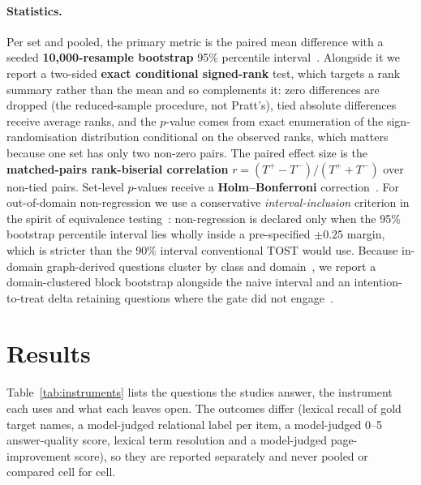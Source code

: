 \documentclass[10pt,twocolumn]{article}
\begin{document}
\paragraph{Statistics.} Per set and pooled, the primary metric is the paired mean difference with a seeded \textbf{10{,}000-resample bootstrap} 95\% percentile interval~\cite{efron1979bootstrap,koehn2004significance}. Alongside it we report a two-sided \textbf{exact conditional signed-rank} test, which targets a rank summary rather than the mean and so complements it: zero differences are dropped (the reduced-sample procedure, not Pratt's), tied absolute differences receive average ranks, and the $p$-value comes from exact enumeration of the sign-randomisation distribution conditional on the observed ranks, which matters because one set has only two non-zero pairs. The paired effect size is the \textbf{matched-pairs rank-biserial correlation} $r=(T^{+}-T^{-})/(T^{+}+T^{-})$ over non-tied pairs. Set-level $p$-values receive a \textbf{Holm--Bonferroni} correction~\cite{dror2018hitchhiker}. For out-of-domain non-regression we use a conservative \emph{interval-inclusion} criterion in the spirit of equivalence testing~\cite{lakens2017equivalence}: non-regression is declared only when the 95\% bootstrap percentile interval lies wholly inside a pre-specified $\pm0.25$ margin, which is stricter than the 90\% interval conventional TOST would use. Because in-domain graph-derived questions cluster by class and domain~\cite{dror2018hitchhiker}, we report a domain-clustered block bootstrap alongside the naive interval and an intention-to-treat delta retaining questions where the gate did not engage~\cite{hollis1999itt}.

\section{Results}\label{sec:results}
Table~\ref{tab:instruments} lists the questions the studies answer, the instrument each uses and what each leaves open. The outcomes differ (lexical recall of gold target names, a model-judged relational label per item, a model-judged 0--5 answer-quality score, lexical term resolution and a model-judged page-improvement score), so they are reported separately and never pooled or compared cell for cell.
\end{document}
